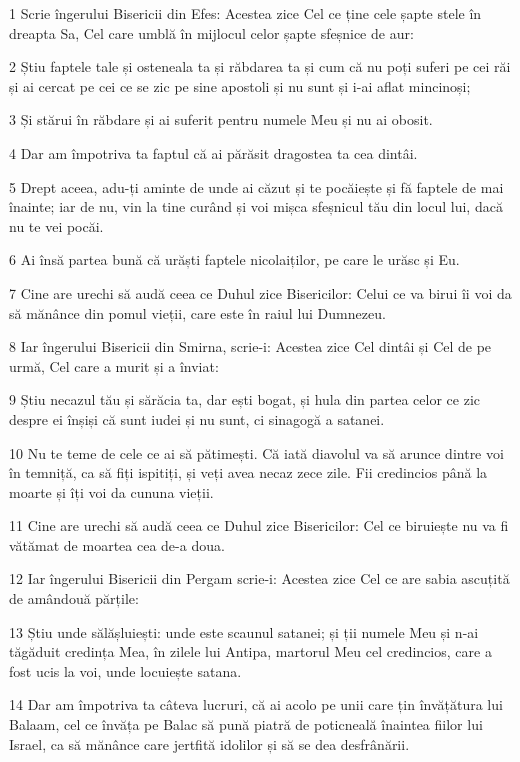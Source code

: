 \par 1 Scrie îngerului Bisericii din Efes: Acestea zice Cel ce ține cele șapte stele în dreapta Sa, Cel care umblă în mijlocul celor șapte sfeșnice de aur:
\par 2 Știu faptele tale și osteneala ta și răbdarea ta și cum că nu poți suferi pe cei răi și ai cercat pe cei ce se zic pe sine apostoli și nu sunt și i-ai aflat mincinoși;
\par 3 Și stărui în răbdare și ai suferit pentru numele Meu și nu ai obosit.
\par 4 Dar am împotriva ta faptul că ai părăsit dragostea ta cea dintâi.
\par 5 Drept aceea, adu-ți aminte de unde ai căzut și te pocăiește și fă faptele de mai înainte; iar de nu, vin la tine curând și voi mișca sfeșnicul tău din locul lui, dacă nu te vei pocăi.
\par 6 Ai însă partea bună că urăști faptele nicolaiților, pe care le urăsc și Eu.
\par 7 Cine are urechi să audă ceea ce Duhul zice Bisericilor: Celui ce va birui îi voi da să mănânce din pomul vieții, care este în raiul lui Dumnezeu.
\par 8 Iar îngerului Bisericii din Smirna, scrie-i: Acestea zice Cel dintâi și Cel de pe urmă, Cel care a murit și a înviat:
\par 9 Știu necazul tău și sărăcia ta, dar ești bogat, și hula din partea celor ce zic despre ei înșiși că sunt iudei și nu sunt, ci sinagogă a satanei.
\par 10 Nu te teme de cele ce ai să pătimești. Că iată diavolul va să arunce dintre voi în temniță, ca să fiți ispitiți, și veți avea necaz zece zile. Fii credincios până la moarte și îți voi da cununa vieții.
\par 11 Cine are urechi să audă ceea ce Duhul zice Bisericilor: Cel ce biruiește nu va fi vătămat de moartea cea de-a doua.
\par 12 Iar îngerului Bisericii din Pergam scrie-i: Acestea zice Cel ce are sabia ascuțită de amândouă părțile:
\par 13 Știu unde sălășluiești: unde este scaunul satanei; și ții numele Meu și n-ai tăgăduit credința Mea, în zilele lui Antipa, martorul Meu cel credincios, care a fost ucis la voi, unde locuiește satana.
\par 14 Dar am împotriva ta câteva lucruri, că ai acolo pe unii care țin învățătura lui Balaam, cel ce învăța pe Balac să pună piatră de poticneală înaintea fiilor lui Israel, ca să mănânce care jertfită idolilor și să se dea desfrânării.
